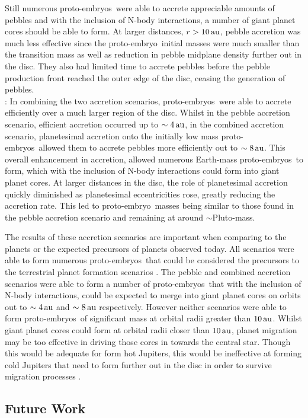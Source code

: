\documentclass[a4paper,fleqn,usenatbib]{mnras}
\newcommand{\au}{{\, {\rm au}}}
\newcommand{\emb}{{{proto-embryo~}}}
\newcommand{\embs}{{{proto-embryos~}}}
\begin{document}
Still numerous \embs were able to accrete appreciable amounts of pebbles and with the inclusion of N-body interactions, a number of giant planet cores should be able to form.
At larger distances, $r>10\au$, pebble accretion was much less effective since the \emb initial masses were much smaller than the transition mass as well as reduction in pebble midplane density further out in the disc.
They also had limited time to accrete pebbles before the pebble production front reached the outer edge of the disc, ceasing the generation of pebbles.\\
: In combining the two accretion scenarios, \embs were able to accrete efficiently over a much larger region of the disc.
Whilst in the pebble accretion scenario, efficient accretion occurred up to $\sim 4\au$, in the combined accretion scenario, planetesimal accretion onto the initially low mass \embs allowed them to accrete pebbles more efficiently out to $\sim 8\au$.
This overall enhancement in accretion, allowed numerous Earth-mass \embs to form, which with the inclusion of N-body interactions could form into giant planet cores.
At larger distances in the disc, the role of planetesimal accretion quickly diminished as planetesimal eccentricities rose, greatly reducing the accretion rate.
This led to \emb masses being similar to those found in the pebble accretion scenario and remaining at around $\sim$Pluto-mass.

The results of these accretion scenarios are important when comparing to the planets or the expected precursors of planets observed today.
All scenarios were able to form numerous \embs that could be considered the precursors to the terrestrial planet formation scenarios \citep{Raymond14}.
The pebble and combined accretion scenarios were able to form a number of \embs that with the inclusion of N-body interactions, could be expected to merge into giant planet cores on orbits out to $\sim 4\au$ and $\sim 8\au$ respectively.
However neither scenarios were able to form \embs of significant mass at orbital radii greater than $10\au$.
Whilst giant planet cores could form at orbital radii closer than $10\au$, planet migration may be too effective in driving those cores in towards the central star.
Though this would be adequate for form hot Jupiters, this would be ineffective at forming cold Jupiters that need to form further out in the disc in order to survive migration processes \citep{ColemanNelson14,Bitsch15,ColemanNelson16b}.

\subsection{Future Work}
\end{document}
